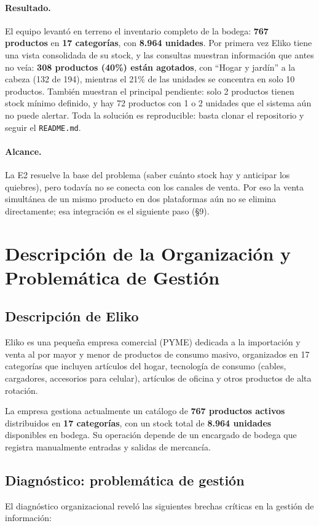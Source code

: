 \documentclass[11pt,letterpaper]{article}
\renewcommand{\_}{\oldus\allowbreak}
\begin{document}
\paragraph{Resultado.} El equipo levantó en terreno el inventario completo de la bodega: \textbf{767 productos} en \textbf{17 categorías}, con \textbf{8.964 unidades}. Por primera vez Eliko tiene una vista consolidada de su stock, y las consultas muestran información que antes no veía: \textbf{308 productos (40\%) están agotados}, con “Hogar y jardín” a la cabeza (132 de 194), mientras el 21\% de las unidades se concentra en solo 10 productos. También muestran el principal pendiente: solo 2 productos tienen stock mínimo definido, y hay 72 productos con 1 o 2 unidades que el sistema aún no puede alertar. Toda la solución es reproducible: basta clonar el repositorio y seguir el \texttt{README.md}.

\paragraph{Alcance.} La E2 resuelve la base del problema (saber cuánto stock hay y anticipar los quiebres), pero todavía no se conecta con los canales de venta. Por eso la venta simultánea de un mismo producto en dos plataformas aún no se elimina directamente; esa integración es el siguiente paso (§9).

\newpage

\section{Descripción de la Organización y Problemática de Gestión}
\subsection{Descripción de Eliko}
Eliko es una pequeña empresa comercial (PYME) dedicada a la importación y venta al por mayor y menor de productos de consumo masivo, organizados en 17 categorías que incluyen artículos del hogar, tecnología de consumo (cables, cargadores, accesorios para celular), artículos de oficina y otros productos de alta rotación.

La empresa gestiona actualmente un catálogo de \textbf{767 productos activos} distribuidos en \textbf{17 categorías}, con un stock total de \textbf{8.964 unidades} disponibles en bodega. Su operación depende de un encargado de bodega que registra manualmente entradas y salidas de mercancía.

\subsection{Diagnóstico: problemática de gestión}
El diagnóstico organizacional reveló las siguientes brechas críticas en la gestión de información:
\end{document}
